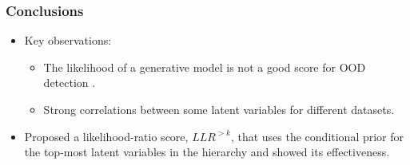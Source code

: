 \begin{frame}
    \frametitle{Conclusions}
    \begin{itemize}
        \item Key observations: 
        \begin{itemize}
            \item The likelihood of a generative model is not a good score for OOD detection \cite{nalisnick_deep_2019}.
            \item Strong correlations between some latent variables for different datasets.
        \end{itemize}
        \item[\highlight{$\rightarrow$}] Proposed a likelihood-ratio score, $LLR^{>k}$, that uses the conditional prior for the top-most latent variables in the hierarchy and showed its effectiveness.
    \end{itemize}
\end{frame}

    


    
